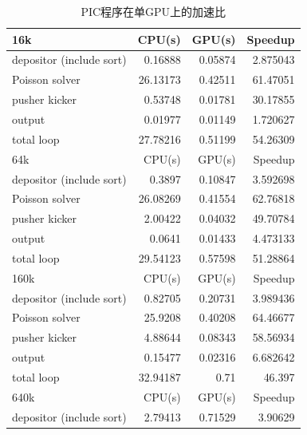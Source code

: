 \begin{table}
  \centering
  \caption{PIC程序在单GPU上的加速比}
  \begin{tabular}{|l|r|r|r|}
    \hline
    16k                      &    CPU(s)      &     GPU(s)    &  Speedup    \\
    \hline
    depositor (include sort) &    0.16888     &     0.05874   &  2.875043   \\
    Poisson solver           &    26.13173    &     0.42511   &  61.47051   \\
    pusher kicker            &    0.53748	  &     0.01781	  &  30.17855   \\
    output                   &    0.01977     &     0.01149   &  1.720627   \\
    total loop               &    27.78216    &     0.51199   &  54.26309   \\
    \hline
    64k                      &    CPU(s)      &     GPU(s)    &  Speedup    \\
    \hline
    depositor (include sort) &    0.3897      &     0.10847   &  3.592698   \\
    Poisson solver           &    26.08269    &     0.41554   &  62.76818   \\
    pusher kicker            &    2.00422	  &     0.04032	  &  49.70784   \\
    output                   &    0.0641      &     0.01433   &  4.473133   \\
    total loop               &    29.54123    &     0.57598   &  51.28864   \\
    \hline
    160k                     &    CPU(s)      &     GPU(s)    &  Speedup    \\
    \hline
    depositor (include sort) &    0.82705     &     0.20731   &  3.989436   \\
    Poisson solver           &    25.9208     &     0.40208   &  64.46677   \\
    pusher kicker            &    4.88644	  &     0.08343	  &  58.56934   \\
    output                   &    0.15477     &     0.02316   &  6.682642   \\
    total loop               &    32.94187    &     0.71      &  46.397     \\
    \hline
    640k                     &    CPU(s)      &     GPU(s)    &  Speedup    \\
    \hline
    depositor (include sort) &    2.79413     &     0.71529   &  3.90629    \\

\end{tabular}
\end{table}
